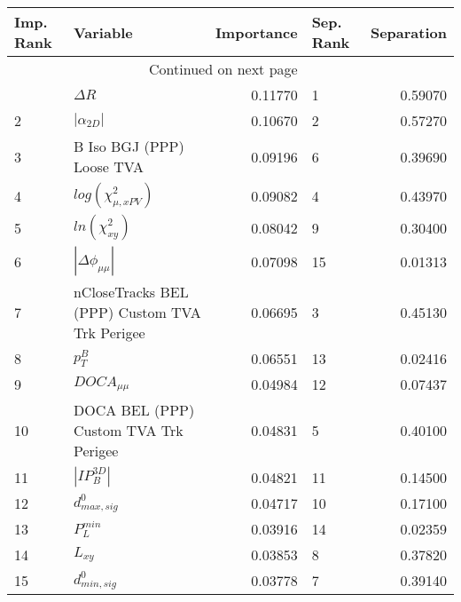 \usepackage{lscape}

\begin{landscape}
\begin{longtable}{llrlr}
\toprule
Imp. Rank &                                       Variable &  Importance & Sep. Rank &  Separation \\
\midrule
\endhead
\midrule
\multicolumn{3}{r}{{Continued on next page}} \\
\midrule
\endfoot

\bottomrule
\endlastfoot
        1 &                                     $\Delta R$ &     0.11770 &         1 &     0.59070 \\
        2 &                                $|\alpha_{2D}|$ &     0.10670 &         2 &     0.57270 \\
        3 &                      B Iso BGJ (PPP) Loose TVA &     0.09196 &         6 &     0.39690 \\
        4 &                      $log(\chi^{2}_{\mu,xPV})$ &     0.09082 &         4 &     0.43970 \\
        5 &                            $ln(\chi^{2}_{xy})$ &     0.08042 &         9 &     0.30400 \\
        6 &                       $|\Delta \phi_{\mu\mu}|$ &     0.07098 &        15 &     0.01313 \\
        7 &  nCloseTracks BEL (PPP) Custom TVA Trk Perigee &     0.06695 &         3 &     0.45130 \\
        8 &                                      $p^B_{T}$ &     0.06551 &        13 &     0.02416 \\
        9 &                                $DOCA_{\mu\mu}$ &     0.04984 &        12 &     0.07437 \\
       10 &          DOCA BEL (PPP) Custom TVA Trk Perigee &     0.04831 &         5 &     0.40100 \\
       11 &                                $|IP_{B}^{3D}|$ &     0.04821 &        11 &     0.14500 \\
       12 &                               $d^0_{max, sig}$ &     0.04717 &        10 &     0.17100 \\
       13 &                                  $P^{min}_{L}$ &     0.03916 &        14 &     0.02359 \\
       14 &                                       $L_{xy}$ &     0.03853 &         8 &     0.37820 \\
       15 &                               $d^0_{min, sig}$ &     0.03778 &         7 &     0.39140 \\
\end{longtable}

\end{landscape}
